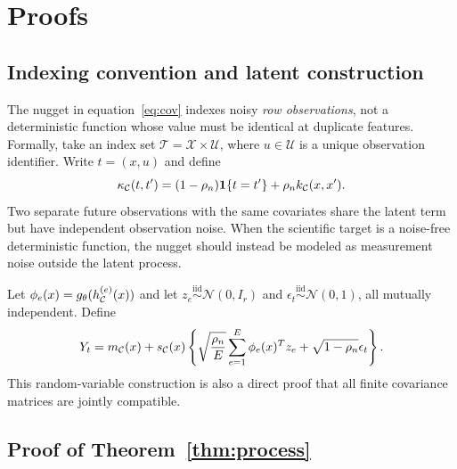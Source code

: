 \section{Proofs}\label{app:proofs}

\subsection{Indexing convention and latent construction}

The nugget in equation~\eqref{eq:cov} indexes noisy \emph{row observations},
not a deterministic function whose value must be identical at duplicate
features.  Formally, take an index set $\mathcal{T}=\mathcal{X}\times
\mathcal{U}$, where $u\in\mathcal{U}$ is a unique observation identifier.
Write $t=(x,u)$ and define
\begin{equation}
 \kappa_{\mathcal{C}}(t,t')=(1-\rho_n)\mathbf 1\{t=t'\}
 +\rho_n k_{\mathcal{C}}(x,x').                                    \label{eq:indexkernel}
\end{equation}
Two separate future observations with the same covariates share the latent
term but have independent observation noise.  When the scientific target is a
noise-free deterministic function, the nugget should instead be modeled as
measurement noise outside the latent process.

Let $\phi_e(x)=g_\theta(h_{\mathcal{C}}^{(e)}(x))$ and let
$z_e\stackrel{\mathrm{iid}}\sim\mathcal N(0,I_r)$ and
$\epsilon_t\stackrel{\mathrm{iid}}\sim\mathcal N(0,1)$, all mutually
independent.  Define
\begin{equation}
 Y_t=m_{\mathcal{C}}(x)+s_{\mathcal{C}}(x)
 \left\{\sqrt{\frac{\rho_n}{E}}\sum_{e=1}^E\phi_e(x)^Tz_e
 +\sqrt{1-\rho_n}\epsilon_t\right\}.                         \label{eq:latent}
\end{equation}
This random-variable construction is also a direct proof that all finite
covariance matrices are jointly compatible.

\subsection{Proof of Theorem~\ref{thm:process}}


